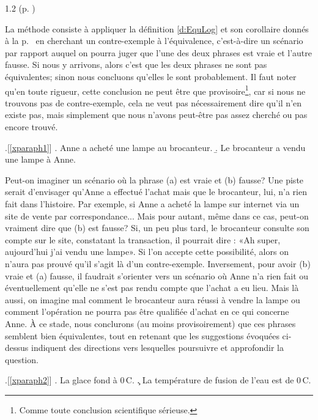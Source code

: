 \begin{Solution}{1.{2}}
 (p. \pageref{exo:1EqLog})

La méthode consiste à appliquer la définition \ref{d:EquLog} et son corollaire donnés à la p.~\pageref{d:EquLog} en cherchant un contre-exemple à l'équivalence, c'est-à-dire un scénario par rapport auquel on pourra juger que l'une des deux phrases est vraie et l'autre fausse.  Si nous y arrivons, alors c'est que les deux phrases ne sont pas équivalentes; sinon nous concluons qu'elles le sont probablement.  Il faut noter qu'en toute rigueur,  cette conclusion  ne peut être que provisoire\footnote{Comme toute conclusion scientifique sérieuse.}, car si nous ne trouvons pas de contre-exemple, cela ne veut pas nécessairement dire qu'il n'en existe pas, mais simplement que nous n'avons peut-être pas assez cherché ou pas encore trouvé.

\ex.[\ref{xparaph1}]
\a.  Anne a acheté une lampe au brocanteur.
\b. Le brocanteur a vendu une lampe à Anne.

Peut-on imaginer un scénario où la phrase (a) est vraie et (b) fausse?
Une piste serait d'envisager qu'Anne a effectué l'achat mais que le brocanteur, lui, n'a rien fait dans l'histoire.  Par exemple, si Anne a acheté la lampe sur internet via un site de vente par correspondance... Mais pour autant, même dans ce cas, peut-on vraiment dire que (b) est fausse?  Si, un peu plus tard, le brocanteur consulte son compte sur le site, constatant la transaction, il pourrait dire : «Ah super, aujourd'hui j'ai vendu une lampe».  Si l'on accepte cette possibilité, alors on n'aura pas prouvé qu'il s'agit là d'un contre-exemple. Inversement, pour avoir (b) vraie et (a) fausse, il faudrait s'orienter vers un scénario où Anne n'a rien fait ou éventuellement qu'elle ne s'est pas rendu compte que l'achat a eu lieu. Mais là aussi, on imagine mal comment le brocanteur aura réussi à vendre la lampe ou comment l'opération ne pourra pas être qualifiée d'achat en ce qui concerne Anne. À ce stade, nous conclurons (au moins provisoirement) que ces phrases semblent bien équivalentes, tout en retenant que les suggestions évoquées ci-dessus indiquent des directions vers lesquelles poursuivre et approfondir la question.

\ex.[\ref{xparaph2}]
\a.  La glace  fond à 0\,\degres C.
\c. La température de fusion de l'eau est de 0\,\degres C.


\end{Solution}
